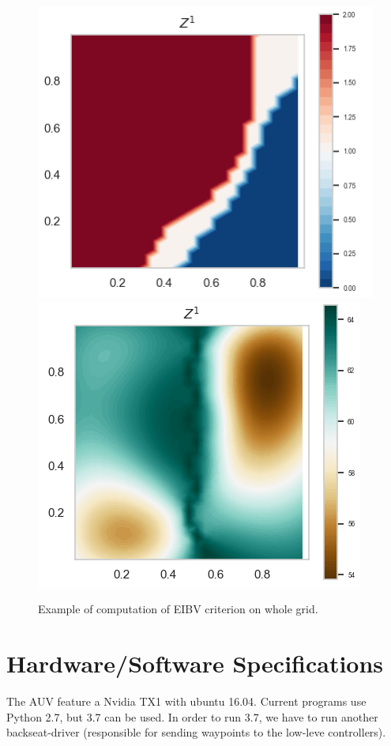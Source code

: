 \documentclass[a4paper,10pt]{article}
\begin{document}
\begin{figure}[tbh!p]
{	\includegraphics[scale=0.5]{images/eibv_whole_design/estimated_excursion.png}
	\includegraphics[scale=0.51]{images/eibv_whole_design/eibv.png}
	}
\caption{Example of computation of EIBV criterion on whole grid.}
\label{fig:example_inv_prob}
\end{figure}

\newpage
\section{Hardware/Software Specifications}
The AUV feature a Nvidia TX1 with ubuntu 16.04. Current programs use Python
2.7, but 3.7 can be used.
In order to run 3.7, we have to run
another backseat-driver (responsible for sending waypoints to the low-leve
controllers).
\end{document}
